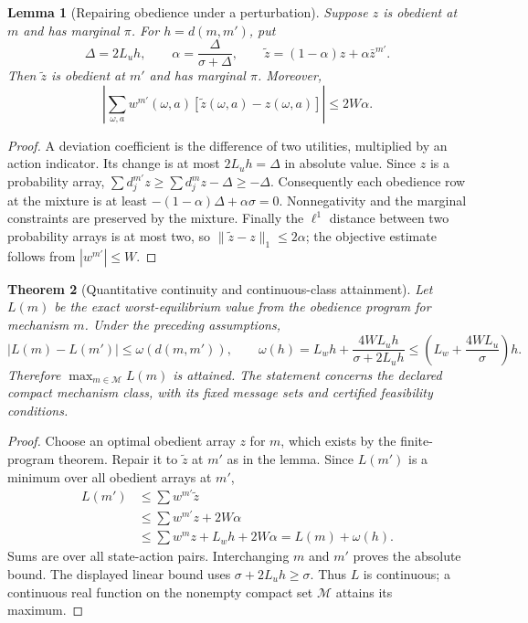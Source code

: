 \documentclass[11pt]{article}
\newtheorem{theorem}{Theorem}
\newtheorem{lemma}[theorem]{Lemma}
\theoremstyle{definition}
\theoremstyle{remark}
\begin{document}
\begin{lemma}[Repairing obedience under a perturbation]
Suppose $z$ is obedient at $m$ and has marginal $\pi$.
For $h=d(m,m')$, put
\[
 \Delta=2L_u h,\qquad
 \alpha=\frac{\Delta}{\sigma+\Delta},\qquad
 \widetilde z=(1-\alpha)z+\alpha\bar z^{m'}.
\]
Then $\widetilde z$ is obedient at $m'$ and has marginal $\pi$.
Moreover,
\[
 \left|\sum_{\omega,a}w^{m'}(\omega,a)
                  [\widetilde z(\omega,a)-z(\omega,a)]\right|
 \leq2W\alpha.
\]
\end{lemma}
\begin{proof}
A deviation coefficient is the difference of two utilities, multiplied
by an action indicator. Its change is at most $2L_uh=\Delta$ in
absolute value. Since $z$ is a probability array,
$\sum d_j^{m'}z\geq\sum d_j^mz-\Delta\geq-\Delta$.
Consequently each obedience row at the mixture is at least
$-(1-\alpha)\Delta+\alpha\sigma=0$. Nonnegativity and the marginal
constraints are preserved by the mixture. Finally the $\ell^1$ distance
between two probability arrays is at most two, so
$\|\widetilde z-z\|_1\leq2\alpha$; the objective estimate follows
from $|w^{m'}|\leq W$.
\end{proof}

\begin{theorem}[Quantitative continuity and continuous-class attainment]
Let $L(m)$ be the exact worst-equilibrium value from the obedience
program for mechanism $m$. Under the preceding assumptions,
\[
 |L(m)-L(m')|\leq\omega(d(m,m')),
 \qquad
 \omega(h)=L_wh+\frac{4WL_uh}{\sigma+2L_uh}
 \leq\left(L_w+\frac{4WL_u}{\sigma}\right)h.
\]
Therefore $\max_{m\in\mathcal M}L(m)$ is attained. The statement
concerns the declared compact mechanism class, with its fixed message
sets and certified feasibility conditions.
\end{theorem}
\begin{proof}
Choose an optimal obedient array $z$ for $m$, which exists by the
finite-program theorem. Repair it to $\widetilde z$ at $m'$ as in the
lemma. Since $L(m')$ is a minimum over all obedient arrays at $m'$,
\begin{align*}
 L(m')&\leq\sum w^{m'}\widetilde z\\
 &\leq\sum w^{m'}z+2W\alpha\\
 &\leq\sum w^mz+L_wh+2W\alpha
   =L(m)+\omega(h).
\end{align*}
Sums are over all state-action pairs. Interchanging $m$ and $m'$ proves
the absolute bound. The displayed linear bound uses
$\sigma+2L_uh\geq\sigma$. Thus $L$ is continuous; a continuous real
function on the nonempty compact set $\mathcal M$ attains its maximum.
\end{proof}
\end{document}
